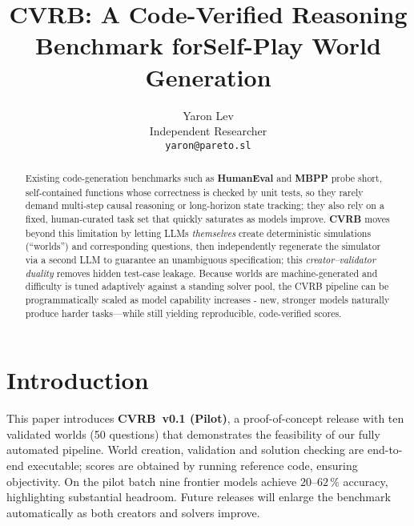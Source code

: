 \documentclass[11pt]{article}
\title{CVRB: A Code-Verified Reasoning Benchmark for\newline Self-Play World Generation}
\author{Yaron Lev \\ Independent Researcher \\ \texttt{yaron@pareto.sl}}
\date{}
\begin{document}
\maketitle

\begin{abstract}
Existing code\mbox{-}generation benchmarks such as \textbf{HumanEval} and \textbf{MBPP} probe short, self\mbox{-}contained functions whose correctness is checked by unit tests, so they rarely demand multi\mbox{-}step causal reasoning or long\mbox{-}horizon state tracking; they also rely on a fixed, human\mbox{-}curated task set that quickly saturates as models improve. \textbf{CVRB} moves beyond this limitation by letting LLMs \emph{themselves} create deterministic simulations (``worlds'') and corresponding questions, then independently regenerate the simulator via a second LLM to guarantee an unambiguous specification; this \emph{creator--validator duality} removes hidden test\mbox{-}case leakage. Because worlds are machine\mbox{-}generated and difficulty is tuned adaptively against a standing solver pool, the CVRB pipeline can be programmatically scaled as model capability increases - new, stronger models naturally produce harder tasks—while still yielding reproducible, code\mbox{-}verified scores.

\end{abstract}

\section{Introduction}
This paper introduces \textbf{CVRB~v0.1 (Pilot)}, a proof\mbox{-}of\mbox{-}concept release with ten validated worlds (50 questions) that demonstrates the feasibility of our fully automated pipeline. World creation, validation and solution checking are end\mbox{-}to\mbox{-}end executable; scores are obtained by running reference code, ensuring objectivity. On the pilot batch nine frontier models achieve $20$--$62\,\%$ accuracy, highlighting substantial headroom. Future releases will enlarge the benchmark automatically as both creators and solvers improve.




\end{document}
